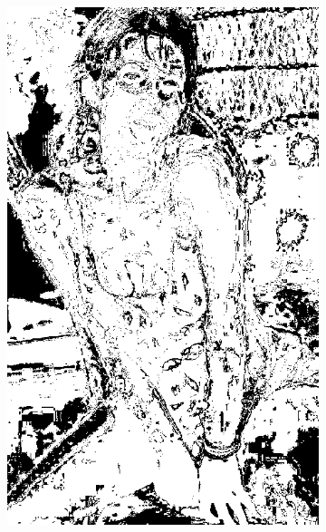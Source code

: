 \begin{figure}[h]
{\begin{subfigure}[b]{0.23\textwidth}
         \includegraphics[width=\textwidth]{images/results/cross/linda_rgb_hgr_sch_bayes.png}
     \end{subfigure}}
     

\end{figure}
